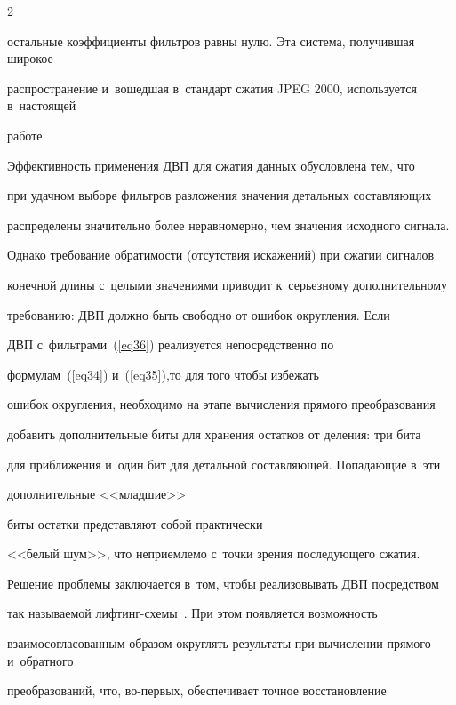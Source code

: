 \begin{multicols}{2}



\noindent

остальные коэффициенты фильтров равны нулю. Эта система, получившая широкое 

распространение и~вошедшая в~стандарт сжатия JPEG 2000, используется в~настоящей 

работе.



Эффективность применения ДВП для сжатия данных обусловлена тем, что 

при удачном выборе фильтров разложения значения детальных со\-став\-ля\-ющих 

распределены значительно более неравномерно, чем значения исходного сигнала. 

Однако требование обратимости (отсутствия искажений) при сжатии сигналов 

конечной длины с~целыми значениями приводит к~серьезному дополнительному 

требованию: ДВП должно быть свободно от ошибок округления. Если 

ДВП с~фильтрами~(\ref{eq36}) реализуется непосредственно по 

формулам~(\ref{eq34}) и~(\ref{eq35}),\linebreak то для того чтобы избежать 

ошибок округления, необходи\-мо на этапе вычисления прямого преобразования 

добавить дополнительные биты для хранения остатков от деления: три бита 

для приближения и~один бит для детальной составляющей. По\-па\-да\-ющие в~эти 

дополнительные <<младшие>>\linebreak

 биты остатки представляют собой практически 

<<белый шум>>, что неприемлемо с~точки зрения последующего сжатия. 

Решение проб\-ле\-мы заключается в~том, чтобы реализовывать ДВП посредством 

так называемой лиф\-тинг-схе\-мы~\cite{b08}. При этом появляется возможность 

взаимосогласованным образом округлять результаты при вычислении прямого и~обратного 

преобразований, что, во-пер\-вых, обеспечивает точное восстановление 


\end{multicols}

